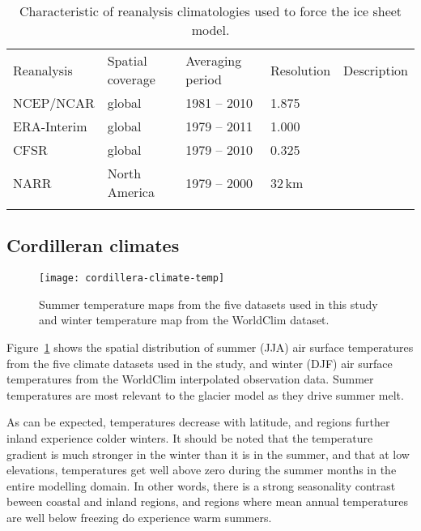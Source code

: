 \begin{table}[t]
	\caption{Characteristic of reanalysis climatologies used to force the ice sheet model.}
	\label{tab:reanalyses}
	\vskip4mm
	\centering
	\begin{tabular}{lllll}
		\tophline
		Reanalysis& Spatial coverage& Averaging period& Resolution& Description\\
		\middlehline
		NCEP/NCAR&  global&     1981 -- 2010& 1.875\degree& \citet{data:ncar}\\
		ERA-Interim&global&     1979 -- 2011& 1.000\degree& \citet{data:erai}\\
		CFSR&       global&     1979 -- 2010& 0.325\degree& \citet{data:cfsr}\\
		NARR&       North America& 1979 -- 2000& 32\,km& \citet{data:narr}\\
		\bottomhline
	\end{tabular}
\end{table}


\subsection{Cordilleran climates}

\begin{figure}[t]
	\vspace*{2mm}
	\begin{center}
		\texttt{[image: cordillera-climate-temp]}
	\end{center}
	\caption{Summer temperature maps from the five datasets used in this study and winter temperature map from the WorldClim dataset.}
	\label{fig:temp}
\end{figure}

Figure~\ref{fig:temp} shows the spatial distribution of summer (JJA) air surface temperatures from the five climate datasets used in the study, and winter (DJF) air surface temperatures from the WorldClim interpolated observation data. Summer temperatures are most relevant to the glacier model as they drive summer melt.

As can be expected, temperatures decrease with latitude, and regions further inland experience colder winters. It should be noted that the temperature gradient is much stronger in the winter than it is in the summer, and that at low elevations, temperatures get well above zero during the summer months in the entire modelling domain. In other words, there is a strong seasonality contrast beween coastal and inland regions, and regions where mean annual temperatures are well below freezing do experience warm summers.

